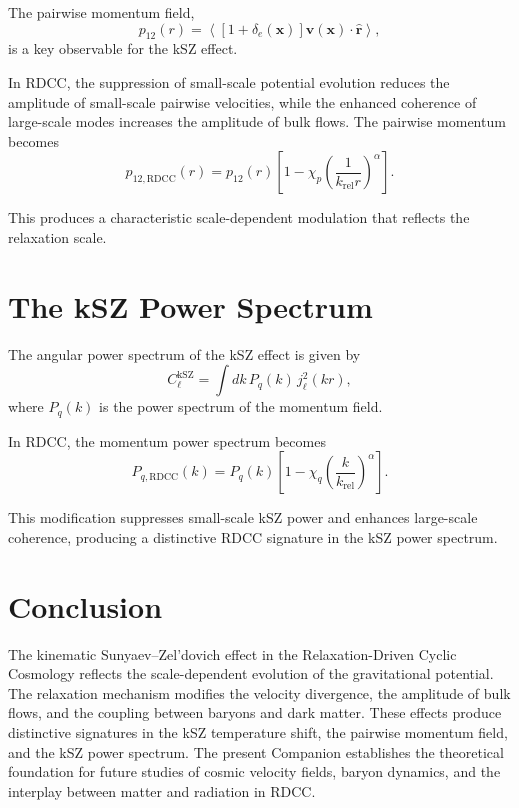 \documentclass[11pt,a4paper]{article}
\begin{document}
The pairwise momentum field,
\begin{equation}
    p_{12}(r)
    = \left\langle
        \left[
            1 + \delta_{e}(\mathbf{x})
        \right]
        \mathbf{v}(\mathbf{x})
        \cdot \hat{\mathbf{r}}
    \right\rangle,
\end{equation}
is a key observable for the kSZ effect.

In RDCC, the suppression of small-scale potential evolution reduces the amplitude 
of small-scale pairwise velocities, while the enhanced coherence of large-scale 
modes increases the amplitude of bulk flows. The pairwise momentum becomes
\begin{equation}
    p_{12,\mathrm{RDCC}}(r)
    = p_{12}(r)
      \left[
        1 - \chi_{p}
        \left(\frac{1}{k_{\mathrm{rel}} r}\right)^{\alpha}
      \right].
\end{equation}

This produces a characteristic scale-dependent modulation that reflects the 
relaxation scale.
\section{The kSZ Power Spectrum}

The angular power spectrum of the kSZ effect is given by
\begin{equation}
    C_{\ell}^{\mathrm{kSZ}}
    = \int dk\,
      P_{q}(k)\,
      j_{\ell}^{2}(kr),
\end{equation}
where $P_{q}(k)$ is the power spectrum of the momentum field.

In RDCC, the momentum power spectrum becomes
\begin{equation}
    P_{q,\mathrm{RDCC}}(k)
    = P_{q}(k)
      \left[
        1 - \chi_{q}
        \left(\frac{k}{k_{\mathrm{rel}}}\right)^{\alpha}
      \right].
\end{equation}

This modification suppresses small-scale kSZ power and enhances large-scale 
coherence, producing a distinctive RDCC signature in the kSZ power spectrum.
\section{Conclusion}

The kinematic Sunyaev--Zel'dovich effect in the Relaxation-Driven Cyclic Cosmology 
reflects the scale-dependent evolution of the gravitational potential. The 
relaxation mechanism modifies the velocity divergence, the amplitude of bulk flows, 
and the coupling between baryons and dark matter. These effects produce distinctive 
signatures in the kSZ temperature shift, the pairwise momentum field, and the kSZ 
power spectrum. The present Companion establishes the theoretical foundation for 
future studies of cosmic velocity fields, baryon dynamics, and the interplay 
between matter and radiation in RDCC.
\end{document}
